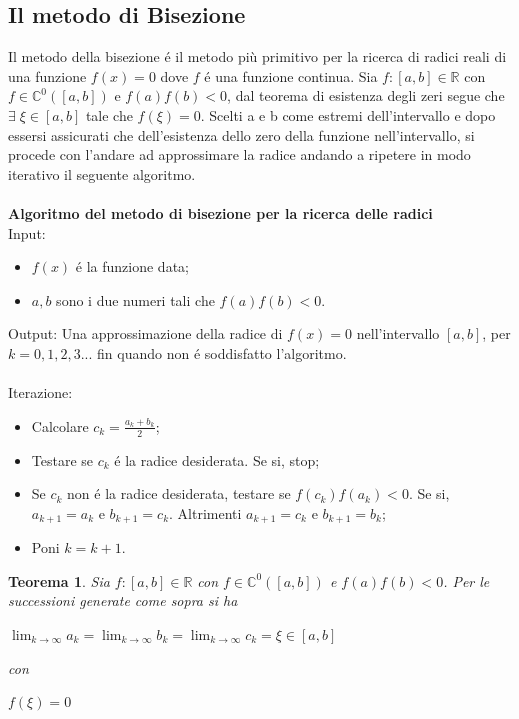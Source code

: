 \documentclass[12pt, letterpaper]{article}
\newtheorem{theorem}{Teorema}
\begin{document}
\subsection{Il metodo di Bisezione}
Il metodo della bisezione \'e il metodo più primitivo per la ricerca di radici reali di una funzione $f(x)=0$ dove $f$ \'e una funzione continua.
Sia $f:[a,b] \in \mathbb{R}$ con $f \in \mathbb{C}^0([a,b])$ e $f(a)f(b)<0$, dal teorema di esistenza degli zeri segue che $\exists \; \xi \in [a,b]$ tale che $f(\xi)=0$.
Scelti a e b come estremi dell'intervallo e dopo essersi assicurati che dell'esistenza dello zero della funzione nell'intervallo,
si procede con l'andare ad approssimare la radice andando a ripetere in modo iterativo il seguente algoritmo. \\~\\
\textbf{Algoritmo del metodo di bisezione per la ricerca delle radici}\\
Input:
\begin{itemize}
    \item $f(x)$ \'e la funzione data;
    \item $a,b$ sono i due numeri tali che $f(a)f(b)<0$.
\end{itemize}
Output: Una approssimazione della radice di $f(x)=0$ nell'intervallo $[a,b]$, per $k=0,1,2,3...$ fin quando non \'e soddisfatto l'algoritmo. \\~\\
Iterazione:
\begin{itemize}
    \item Calcolare $c_k=\frac{a_k+b_k}{2}$;
    \item Testare se $c_k$ \'e la radice desiderata. Se si, stop;
    \item Se $c_k$ non \'e la radice desiderata, testare se $f(c_k)f(a_k)<0$. Se si, $a_{k+1}=a_k$ e $b_{k+1}=c_k$. Altrimenti $a_{k+1}=c_k$ e $b_{k+1}=b_k$;
    \item Poni $k=k+1$.
\end{itemize}
\begin{theorem}
    Sia $f:[a,b] \in \mathbb{R}$ con $f \in \mathbb{C}^0([a,b])$ e $f(a)f(b)<0$. Per le successioni generate come sopra si ha
\begin{center}
    $\lim_{k \to \infty} a_k=\lim_{k \to \infty}b_k=\lim_{k \to \infty}c_k=\xi \in [a,b]$
\end{center}
con
\begin{center}
    $f(\xi)=0$
\end{center}
\end{theorem}
\end{document}
